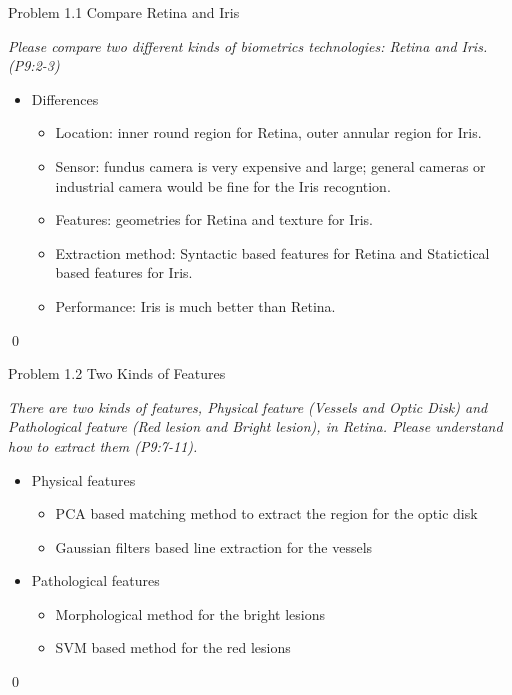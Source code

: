 \documentclass[
        ]{beamer}
\begin{document}
    		\begin{frame}[t]{Problem 1.1 Compare Retina and Iris}    		
    			\begin{overprint}
    			\emph{Please compare two different kinds of biometrics technologies: Retina and Iris. (P9:2-3)}
    			\onslide<2> 
    			\onslide<3> 
    			\onslide<4>
    				\begin{itemize}
    				\item Differences
    					\begin{itemize}
    					\item Location: inner round region for Retina, outer annular region for Iris.
    					\item Sensor: fundus camera is very expensive and large; general cameras or industrial camera would be fine for the Iris recogntion.
    					\item Features: geometries for Retina and texture for Iris.
    					\item Extraction method: Syntactic based features for Retina and Statictical based features for Iris.
    					\item Performance: Iris is much better than Retina.
    					\end{itemize}		
    				\end{itemize}\qed		
    			\end{overprint}
    		\end{frame}
    
    		\begin{frame}[t]{Problem 1.2 Two Kinds of Features}    		
    			\begin{overprint}
    			\onslide<1>
    			\emph{There are two kinds of features, Physical feature (Vessels and Optic Disk) and Pathological feature (Red lesion and Bright lesion), in Retina. Please understand how to extract them (P9:7-11).}
    			\onslide<2> \inpdfc{9}{7}
    			\onslide<3> \inpdfc{9}{8}
    			\onslide<4> \inpdfc{9}{9}
    			\onslide<5> \inpdfc{9}{10}
    			\onslide<6> \inpdfc{9}{11}
    			\onslide<7>
    				\begin{itemize}
    				\item Physical features	
    					\begin{itemize}
    					\item PCA based matching method to extract the region for the optic disk
    					\item Gaussian filters based line extraction for the vessels
    					\end{itemize}		
    				\item Pathological features	
    					\begin{itemize}
    					\item Morphological method for the bright lesions
    					\item SVM based method for the red lesions
    					\end{itemize}		
    				\end{itemize}\qed		
    			\end{overprint}
    		\end{frame}
    
\end{document}
